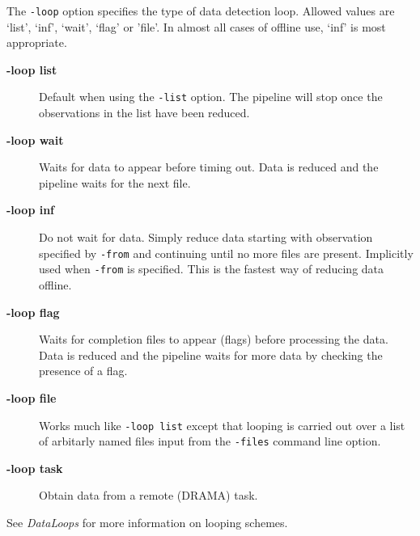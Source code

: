 \documentclass[twoside,11pt]{article}
\renewcommand{\_}{\texttt{\symbol{95}}}
\begin{document}
The \texttt{-loop} option specifies the type of data detection loop. Allowed
values are `list', `inf', `wait', `flag' or 'file'. In almost all cases of
offline use, `inf' is most appropriate.

\begin{description}

\item[{\textbf{-loop list}}] \mbox{}

Default when using the \texttt{-list} option. The pipeline will stop
once the observations in the list have been reduced.


\item[{\textbf{-loop wait}}] \mbox{}

Waits for data to appear before timing out. Data is reduced and the pipeline
waits for the next file.


\item[{\textbf{-loop inf}}] \mbox{}

Do not wait for data. Simply reduce data starting with observation
specified by \texttt{-from} and continuing until no more files are present.
Implicitly used when \texttt{-from} is specified. This is the fastest way
of reducing data offline.


\item[{\textbf{-loop flag}}] \mbox{}

Waits for completion files to appear (flags) before processing the data.
Data is reduced and the pipeline waits for more data by checking the
presence of a flag.


\item[{\textbf{-loop file}}] \mbox{}

Works much like \texttt{-loop list} except that looping is carried out over a
list of arbitarly named files input from the \texttt{-files} command line option.


\item[{\textbf{-loop task}}] \mbox{}

Obtain data from a remote (DRAMA) task.

\end{description}


See \emph{DataLoops} for more
information on looping schemes.
\end{document}
